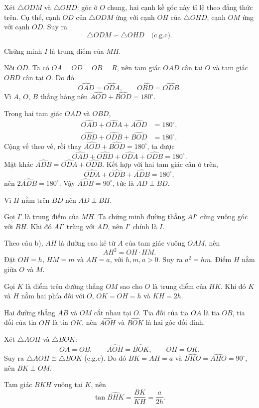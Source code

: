 \begin{bt}[2,5 điểm]
{\begin{enumerate}
Xét $\triangle ODM$ và $\triangle OHD$: góc ở $O$ chung, hai cạnh kề góc này tỉ lệ theo đẳng thức trên. Cụ thể, cạnh $OD$ của $\triangle ODM$ ứng với cạnh $OH$ của $\triangle OHD$, cạnh $OM$ ứng với cạnh $OD$. Suy ra
\[
\triangle ODM\backsim\triangle OHD
\quad\text{(c.g.c)}.
\]

Chứng minh $I$ là trung điểm của $MH$.

Nối $OD$. Ta có $OA=OD=OB=R$, nên tam giác $OAD$ cân tại $O$ và tam giác $OBD$ cân tại $O$. Do đó
\[
\widehat{OAD}=\widehat{ODA},\qquad \widehat{OBD}=\widehat{ODB}.
\]
Vì $A$, $O$, $B$ thẳng hàng nên $\widehat{AOD}+\widehat{BOD}=180^\circ$.

Trong hai tam giác $OAD$ và $OBD$,
\begin{align*}
\widehat{OAD}+\widehat{ODA}+\widehat{AOD}&=180^\circ,\\
\widehat{OBD}+\widehat{ODB}+\widehat{BOD}&=180^\circ.
\end{align*}
Cộng vế theo vế, rồi thay $\widehat{AOD}+\widehat{BOD}=180^\circ$, ta được
\[
\widehat{OAD}+\widehat{OBD}+\widehat{ODA}+\widehat{ODB}=180^\circ.
\]
Mặt khác $\widehat{ADB}=\widehat{ODA}+\widehat{ODB}$. Kết hợp với hai tam giác cân ở trên,
\[
\widehat{ODA}+\widehat{ODB}+\widehat{ADB}=180^\circ,
\]
nên $2\widehat{ADB}=180^\circ$. Vậy $\widehat{ADB}=90^\circ$, tức là $AD\perp BD$.

Vì $H$ nằm trên $BD$ nên $AD\perp BH$.

Gọi $I'$ là trung điểm của $MH$. Ta chứng minh đường thẳng $AI'$ cũng vuông góc với $BH$. Khi đó $AI'$ trùng với $AD$, nên $I'$ chính là $I$.

Theo câu b), $AH$ là đường cao kẻ từ $A$ của tam giác vuông $OAM$, nên
\[
AH^2=OH\cdot HM.
\]
Đặt $OH=h$, $HM=m$ và $AH=a$, với $h,m,a>0$. Suy ra $a^2=hm$. Điểm $H$ nằm giữa $O$ và $M$.

Gọi $K$ là điểm trên đường thẳng $OM$ sao cho $O$ là trung điểm của $HK$. Khi đó $K$ và $H$ nằm hai phía đối với $O$, $OK=OH=h$ và $KH=2h$.

Hai đường thẳng $AB$ và $OM$ cắt nhau tại $O$. Tia đối của tia $OA$ là tia $OB$, tia đối của tia $OH$ là tia $OK$, nên $\widehat{AOH}$ và $\widehat{BOK}$ là hai góc đối đỉnh.

Xét $\triangle AOH$ và $\triangle BOK$:
\[
OA=OB,\qquad \widehat{AOH}=\widehat{BOK},\qquad OH=OK.
\]
Suy ra $\triangle AOH\cong\triangle BOK$ (c.g.c). Do đó $BK=AH=a$ và $\widehat{BKO}=\widehat{AHO}=90^\circ$, nên $BK\perp OM$.

Tam giác $BKH$ vuông tại $K$, nên
\[
\tan\widehat{BHK}=\dfrac{BK}{KH}=\dfrac{a}{2h}.
\]


\end{enumerate}}
\end{bt}
